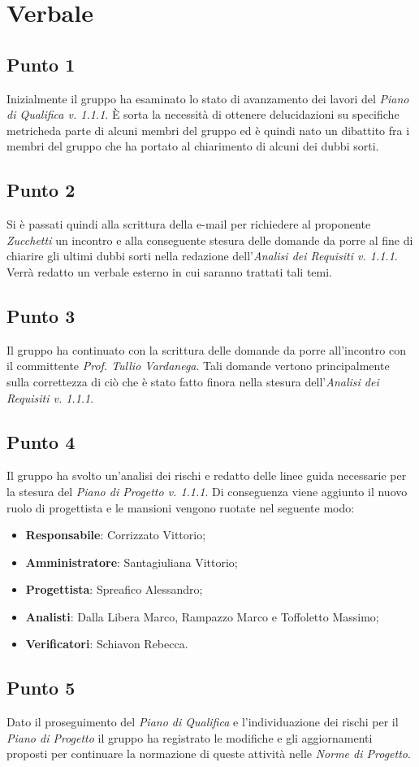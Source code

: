 \section{Verbale}
    \subsection{Punto 1}
        Inizialmente il gruppo ha esaminato lo stato di avanzamento dei lavori del \textit{Piano di Qualifica v. 1.1.1}. È sorta la necessità di ottenere delucidazioni su specifiche metriche\glosp da parte di alcuni membri del gruppo ed è quindi nato un dibattito fra i membri del gruppo che ha portato al chiarimento di alcuni dei dubbi sorti.
    \subsection{Punto 2}
        Si è passati quindi alla scrittura della e-mail per richiedere al proponente \textit{Zucchetti} un incontro e alla conseguente stesura delle domande da porre al fine di chiarire gli ultimi dubbi sorti nella redazione dell'\textit{Analisi dei Requisiti v. 1.1.1}. Verrà redatto un verbale esterno in cui saranno trattati tali temi.
    \subsection{Punto 3}
        Il gruppo ha continuato con la scrittura delle domande da porre all'incontro con il committente \textit{Prof. Tullio Vardanega}. Tali domande vertono principalmente sulla correttezza di ciò che è stato fatto finora nella stesura dell'\textit{Analisi dei Requisiti v. 1.1.1}.
    \subsection{Punto 4}
     	Il gruppo ha svolto un'analisi dei rischi e redatto delle linee guida necessarie per la stesura del \textit{Piano di Progetto v. 1.1.1}. 
        Di conseguenza viene aggiunto il nuovo ruolo di progettista e le mansioni vengono ruotate nel seguente modo:
        \begin{itemize}
            \item \textbf{Responsabile}: Corrizzato Vittorio;
            \item \textbf{Amministratore}: Santagiuliana Vittorio;
            \item \textbf{Progettista}: Spreafico Alessandro;
            \item \textbf{Analisti}: Dalla Libera Marco, Rampazzo Marco e Toffoletto Massimo;
            \item \textbf{Verificatori}: Schiavon Rebecca. 
        \end{itemize}
    \subsection{Punto 5}
        Dato il proseguimento del \textit{Piano di Qualifica} e l'individuazione dei rischi per il \textit{Piano di Progetto} il gruppo ha registrato le modifiche e gli aggiornamenti proposti per continuare la normazione di queste attività nelle \textit{Norme di Progetto}.
    
